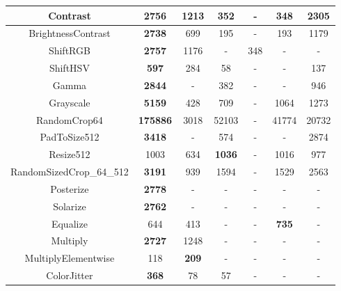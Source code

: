 \begin{table}[H]
{\begin{tabular}{|c|c|c|c|c|c|c|}
Contrast                 & \textbf{2756}   & 1213         & 352           & -    & 348          & 2305  \\ \hline
BrightnessContrast       & \textbf{2738}   & 699          & 195           & -    & 193          & 1179  \\ \hline
ShiftRGB                 & \textbf{2757}   & 1176         & -             & 348  & -            & -     \\ \hline
ShiftHSV                 & \textbf{597}    & 284          & 58            & -    & -            & 137   \\ \hline
Gamma                    & \textbf{2844}   & -            & 382           & -    & -            & 946   \\ \hline
Grayscale                & \textbf{5159}   & 428          & 709           & -    & 1064         & 1273  \\ \hline
RandomCrop64             & \textbf{175886} & 3018         & 52103         & -    & 41774        & 20732 \\ \hline
PadToSize512             & \textbf{3418}   & -            & 574           & -    & -            & 2874  \\ \hline
Resize512                & 1003            & 634          & \textbf{1036} & -    & 1016         & 977   \\ \hline
RandomSizedCrop\_64\_512 & \textbf{3191}   & 939          & 1594          & -    & 1529         & 2563  \\ \hline
Posterize                & \textbf{2778}   & -            & -             & -    & -            & -     \\ \hline
Solarize                 & \textbf{2762}   & -            & -             & -    & -            & -     \\ \hline
Equalize                 & 644             & 413          & -             & -    & \textbf{735} & -     \\ \hline
Multiply                 & \textbf{2727}   & 1248         & -             & -    & -            & -     \\ \hline
MultiplyElementwise      & 118             & \textbf{209} & -             & -    & -            & -     \\ \hline
ColorJitter              & \textbf{368}    & 78           & 57            & -    & -            & -     \\ \hline
\end{tabular}%
}
\end{table}